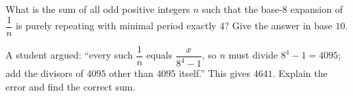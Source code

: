 What is the sum of all odd positive integers \(n\) such that the base-\(8\) expansion of \(\dfrac{1}{n}\) is purely repeating with minimal period exactly \(4\)? Give the answer in base \(10\).

A student argued: ``every such \(\dfrac{1}{n}\) equals \(\dfrac{x}{8^4-1}\), so \(n\) must divide \(8^4-1=4095\); add the divisors of \(4095\) other than \(4095\) itself.'' This gives \(4641\). Explain the error and find the correct sum.
